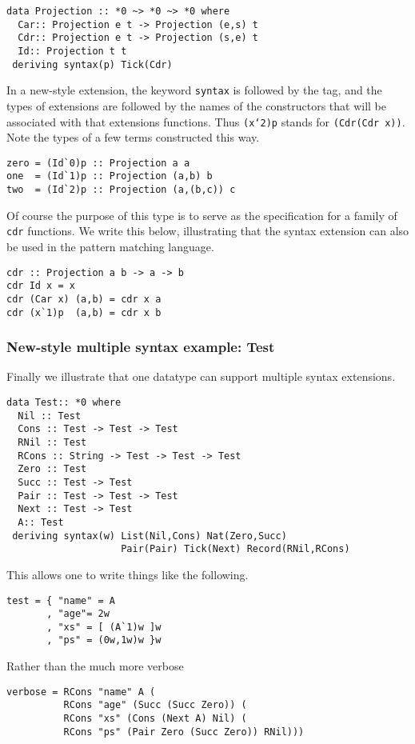 \documentclass[11pt,twoside]{article}
\begin{document}
\begin{verbatim}
data Projection :: *0 ~> *0 ~> *0 where
  Car:: Projection e t -> Projection (e,s) t
  Cdr:: Projection e t -> Projection (s,e) t
  Id:: Projection t t
 deriving syntax(p) Tick(Cdr) 
\end{verbatim} 

In a new-style extension, the keyword {\tt syntax} is followed by the tag, and the 
types of extensions are followed by the names of the constructors that will be associated
with that extensions functions. Thus {\tt (x`2)p} stands for {\tt (Cdr(Cdr x))}.
Note the types of a few terms constructed this way.

\begin{verbatim}
zero = (Id`0)p :: Projection a a
one  = (Id`1)p :: Projection (a,b) b
two  = (Id`2)p :: Projection (a,(b,c)) c
\end{verbatim} 

Of course the purpose of this type is to serve as the specification for a family
of {\tt cdr} functions. We write this below, illustrating that the syntax extension
can also be used in the pattern matching language.

\begin{verbatim} 
cdr :: Projection a b -> a -> b
cdr Id x = x
cdr (Car x) (a,b) = cdr x a
cdr (x`1)p  (a,b) = cdr x b
\end{verbatim} 

\subsubsection{New-style multiple syntax example: Test}

Finally we illustrate that one datatype can support multiple syntax extensions.


\begin{verbatim}
data Test:: *0 where
  Nil :: Test
  Cons :: Test -> Test -> Test
  RNil :: Test
  RCons :: String -> Test -> Test -> Test
  Zero :: Test
  Succ :: Test -> Test
  Pair :: Test -> Test -> Test
  Next :: Test -> Test
  A:: Test
 deriving syntax(w) List(Nil,Cons) Nat(Zero,Succ) 
                    Pair(Pair) Tick(Next) Record(RNil,RCons)
\end{verbatim}
This allows one to write things like the following.

\begin{verbatim}
test = { "name" = A
       , "age"= 2w
       , "xs" = [ (A`1)w ]w
       , "ps" = (0w,1w)w }w
\end{verbatim}
Rather than the much more verbose
\begin{verbatim}
verbose = RCons "name" A (
          RCons "age" (Succ (Succ Zero)) (
          RCons "xs" (Cons (Next A) Nil) (
          RCons "ps" (Pair Zero (Succ Zero)) RNil)))
\end{verbatim}
\end{document}
